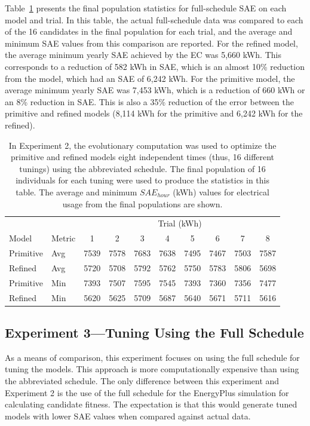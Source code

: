 \documentclass[preprint, review, 12pt]{elsarticle}
\begin{document}
Table~\ref{tab:hourly-abbrev} presents the final population statistics for full-schedule SAE on each model and trial. In this table, the actual full-schedule data was compared to each of the 16 candidates in the final population for each trial, and the average and minimum SAE values from this comparison are reported. For the refined model, the average minimum yearly SAE achieved by the EC was 5,660 kWh. This corresponds to a reduction of 582 kWh in SAE, which is an almost 10\% reduction from the model, which had an SAE of 6,242 kWh. For the primitive model, the average minimum yearly SAE was 7,453 kWh, which is a reduction of 660 kWh or an 8\% reduction in SAE. This is also a 35\% reduction of the error between the primitive and refined models (8,114 kWh for the primitive and 6,242 kWh for the refined).


\begin{table}[htbp]
\centering
\caption{In Experiment 2, the evolutionary computation was used to optimize the primitive and refined models eight independent times (thus, 16 different tunings) using the abbreviated schedule. The final population of 16 individuals for each tuning were used to produce the statistics in this table. The average and minimum $SAE_{hour}$ (kWh) values for electrical usage from the final populations are shown.}
\label{tab:hourly-abbrev}
\begin{tabular}{llcccccccc}
\toprule
 &  & \multicolumn{8}{c}{Trial (kWh)}\\
Model & Metric & 1 & 2 & 3 & 4 & 5 & 6 & 7 & 8\\
\midrule
Primitive & Avg & 7539 & 7578 & 7683 & 7638 & 7495 & 7467 & 7503 & 7587\\\rowcolor{DarkRow}
Refined   & Avg & 5720 & 5708 & 5792 & 5762 & 5750 & 5783 & 5806 & 5698\\
Primitive & Min & 7393 & 7507 & 7595 & 7545 & 7393 & 7360 & 7356 & 7477\\\rowcolor{DarkRow}
Refined   & Min & 5620 & 5625 & 5709 & 5687 & 5640 & 5671 & 5711 & 5616\\
\bottomrule
\end{tabular}
\end{table}


\subsection{Experiment 3---Tuning Using the Full Schedule}
\label{sub:experiment3}
As a means of comparison, this experiment focuses on using the full schedule for tuning the models. This approach is more computationally expensive than using the abbreviated schedule. The only difference between this experiment and Experiment 2 is the use of the full schedule for the EnergyPlus simulation for calculating candidate fitness. The expectation is that this would generate tuned models with lower SAE values when compared against actual data.
\end{document}
